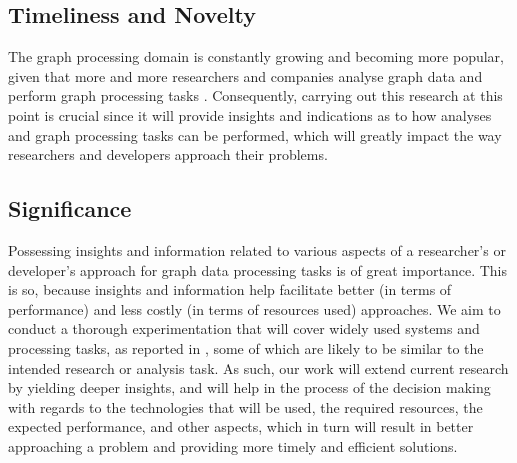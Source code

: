 \documentclass[a4paper,11pt]{article}
\begin{document}

\subsection{Timeliness and Novelty}

\par The graph processing domain is constantly growing and becoming more popular, given that more and more researchers and companies analyse graph data and perform graph processing tasks \cite{facebook-trillion, twitter-sentiment}. Consequently, carrying out this research at this point is crucial since it will provide insights and indications as to how analyses and graph processing tasks can be performed, which will greatly impact the way researchers and developers approach their problems.


\subsection{Significance}



\par Possessing insights and information related to various aspects of a researcher's or developer's approach for graph data processing tasks is of great importance. This is so, because insights and information help facilitate better (in terms of performance) and less costly (in terms of resources used) approaches. We aim to conduct a thorough experimentation that will cover widely used systems and processing tasks, as reported in \cite{survey}, some of which are likely to be similar to the intended research or analysis task. As such, our work will extend current research by yielding deeper insights, and will help in the process of the decision making with regards to the technologies that will be used, the required resources, the expected performance, and other aspects, which in turn will result in better approaching a problem and providing more timely and efficient solutions.


\end{document}
